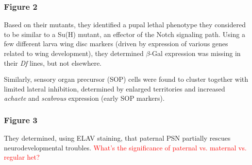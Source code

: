 \documentclass[12pt]{report}
\newcommand{\be}{\beta}
\begin{document}
\subsubsection{Figure 2} Based on their mutants, they identified a pupal lethal phenotype they considered to be similar to a Su(H) mutant, an effector of the Notch signaling path. Using a few different larva wing disc markers (driven by expression of various genes related to wing development), they determined $\be$-Gal expression was missing in their \textit{Df} lines, but not elsewhere.\newline

Similarly, sensory organ precursor (SOP) cells were found to cluster together with limited lateral inhibition, determined by enlarged territories and increased \textit{achaete} and \textit{scabrous} expression (early SOP markers). 

\subsubsection{Figure 3} They determined, using ELAV staining, that paternal PSN partially rescues neurodevelopmental troubles. \textcolor{red}{What's the significance of paternal vs. maternal vs. regular het?}
\end{document}
